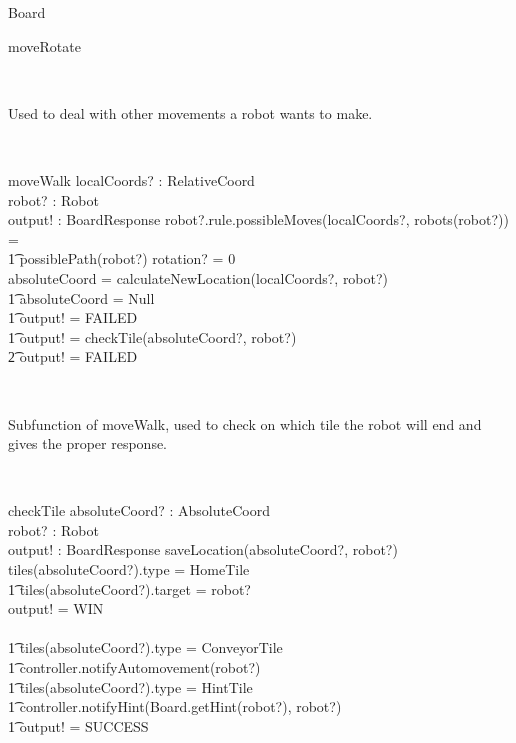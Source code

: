 \begin{class}{Board}
\begin{schema}{moveRotate}
\end{schema} \\
\begin{classcom}
Used to deal with other movements a robot wants to make.
\end{classcom} \\
\begin{schema}{moveWalk}
localCoords? : RelativeCoord \\
robot? : Robot \\
output! : BoardResponse
\where
\IF robot?.rule.possibleMoves(localCoords?, robots(robot?)) = \\ \t1
possiblePath(robot?) \wedge rotation? = 0 \\
\THEN absoluteCoord = calculateNewLocation(localCoords?, robot?)\\ \t1
\IF absoluteCoord = Null \\ \t1
\THEN output! = FAILED \\ \t1
\ELSE output! = checkTile(absoluteCoord?, robot?)\\ \t2
\ELSE output! = FAILED
\end{schema} \\
\znewpage
\begin{classcom}
Subfunction of moveWalk, used to check on which tile the robot will end and gives the proper response.
\end{classcom} \\
\begin{schema}{checkTile}
absoluteCoord? : AbsoluteCoord \\
robot? : Robot \\
output! : BoardResponse
\where
saveLocation(absoluteCoord?, robot?) \\
\IF tiles(absoluteCoord?).type = HomeTile \\ \t1
tiles(absoluteCoord?).target = robot? \\
\THEN output! = WIN \\ \
\ELSE  \\ \t1
\IF tiles(absoluteCoord?).type = ConveyorTile \\ \t1
\THEN controller.notifyAutomovement(robot?) \\ \t1
\IF tiles(absoluteCoord?).type = HintTile \\ \t1
\THEN controller.notifyHint(Board.getHint(robot?), robot?) \\ \t1
output! = SUCCESS
\end{schema} \\
\begin{classcom}

\end{classcom}
\end{class}

